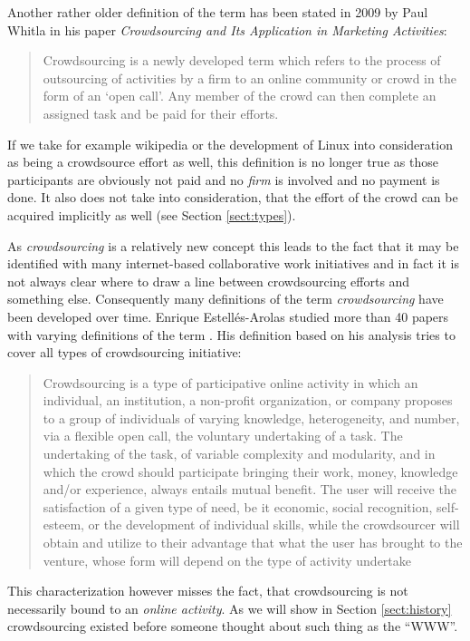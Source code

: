 \documentclass{acm_proc_article-sp}
\begin{document}
Another rather older definition of the term has been stated in 2009 by Paul Whitla in his paper \textit{Crowdsourcing and Its Application in Marketing Activities}\cite{whitla:crowd}:
\begin{quote}
Crowdsourcing is a newly developed term which refers to the process of outsourcing of activities by a firm to an online community or crowd in the form of an ‘open call’. Any member of the crowd can then complete an assigned task and be paid for their efforts. 
\end{quote}
If we take for example wikipedia or the development of Linux into consideration as being a crowdsource effort as well, this definition is no longer true as those participants are obviously not paid and no \textit{firm} is involved and no payment is done. It also does not take into consideration, that the effort of the crowd can be acquired implicitly as well (see Section \ref{sect:types}).

As \textit{crowdsourcing} is a relatively new concept this leads to the fact that it may be identified with many internet-based collaborative work initiatives and in fact it is not always clear where to draw a line between crowdsourcing efforts and something else. Consequently many definitions of the term \textit{crowdsourcing} have been developed over time. Enrique Estellés-Arolas studied more than 40 papers with varying definitions of the term \cite{arolas:definition}. His definition based on his analysis tries to cover all types of crowdsourcing initiative:
\begin{quote}
Crowdsourcing is a type of participative online activity in which an individual, an institution, a non-profit organization, or company proposes to a group of individuals of varying knowledge, heterogeneity, and number, via a flexible open call, the voluntary undertaking of a task.  The undertaking of the task, of variable complexity and modularity, and in which the crowd should participate bringing their work, money, knowledge and/or experience, always entails mutual benefit. The user will receive the satisfaction of a given type of need, be it economic, social recognition, self-esteem, or the development of individual skills, while the crowdsourcer will obtain and utilize to their advantage that what the user has brought to the venture, whose form will depend on the type of activity undertake
\end{quote}
This characterization however misses the fact, that crowdsourcing is not necessarily bound to an \textit{online activity}. As we will show in Section \ref{sect:history} crowdsourcing existed before someone thought about such thing as the ``WWW''.
\end{document}
